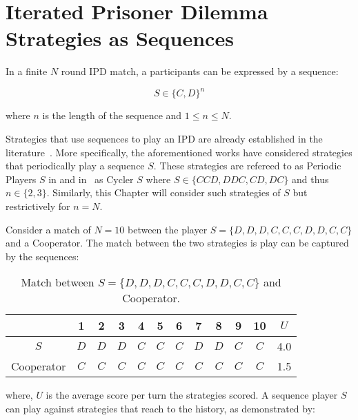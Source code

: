 \section{Iterated Prisoner Dilemma Strategies as Sequences}\label{section:ipd_as_sequences}

In a finite \(N\) round IPD match, a participants can be expressed by a sequence:

\begin{equation}
    S \in \{C, D\} ^ n
\end{equation}

where \(n\) is the length of the sequence and \(1 \leq n \leq N\).

Strategies that use sequences to play an IPD are already established
in the literature~\cite{Beaufils1997, Knight2016, Li2011, Mittal2009}. More
specifically, the aforementioned works have considered strategies that
periodically play a sequence \(S\). These strategies are refereed to as Periodic
Players \(S\) in \cite{Li2011, Mittal2009} and in~\cite{Knight2016} as Cycler
\(S\) where \(S \in \{CCD, DDC, CD, DC\}\) and thus \(n \in \{2, 3\}\). Similarly, this Chapter will
consider such strategies of \(S\) but restrictively for \(n = N\).

Consider a match of \(N = 10\) between the player \(S = \{D, D, D, C, C, C, D,
D, C, C\}\) and a Cooperator. The match between the two strategies is play can
be captured by the sequences:

\begin{table}[htb]
\centering
\begin{tabular}{cccccccccccc}
    & \textbf{1} & \textbf{2} & \textbf{3} & \textbf{4}  & \textbf{5} & \textbf{6} & \textbf{7} & \textbf{8}  & \textbf{9} & \textbf{10} & \(U\) \\ \midrule
    \(S\) & \(D\) & \(D\) & \(D\) & \(C\) & \(C\) & \(C\) & \(D\) & \(D\) & \(C\) & \(C\) & 4.0 \\
    Cooperator & \(C\) & \(C\) & \(C\) & \(C\) & \(C\) & \(C\) & \(C\) & \(C\) & \(C\) & \(C\) & 1.5 \\ \bottomrule
\end{tabular}
\caption{Match between \(S = \{D, D, D, C, C, C, D, D, C, C\}\) and Cooperator.}\label{table:s_vs_cooperator}
\end{table}

where, \(U\) is the average score per turn the strategies scored. A sequence
player \(S\) can play against strategies that reach to the history, as demonstrated
by:

